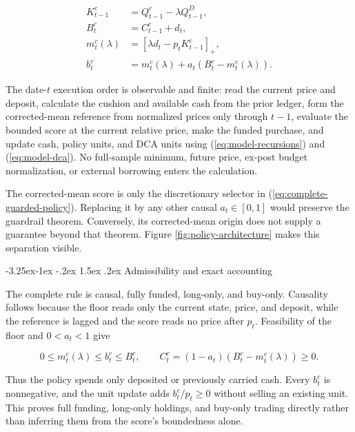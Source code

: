 \documentclass[12pt,a4paper,oneside]{report}
\makeatletter
\renewcommand\subsection{\@startsection{subsection}{2}{\z@}%
  {-3.25ex\@plus -1ex \@minus -.2ex}%
  {1.5ex \@plus .2ex}%
  {\normalfont\fontsize{12}{15}\selectfont\bfseries}}
\makeatother
\begin{document}
\begin{equation}
  \begin{split}
  K_{t-1}^c&=Q_{t-1}^c-\lambda Q_{t-1}^D,\\
  B_t^c&=C_{t-1}^c+d_t,\\
  m_t^c(\lambda)&=\left[\lambda d_t-p_tK_{t-1}^c\right]_+,\\
  b_t^c&=m_t^c(\lambda)
    +a_t\left(B_t^c-m_t^c(\lambda)\right).
  \end{split}
  \label{eq:complete-guarded-policy}
\end{equation}

The date-$t$ execution order is observable and finite: read the current price
and deposit, calculate the cushion and available cash from the prior ledger,
form the corrected-mean reference from normalized prices only through
$t-1$, evaluate the bounded score at the current relative price, make the
funded purchase, and update cash, policy units, and DCA units using
(\ref{eq:model-recursions}) and (\ref{eq:model-dca}). No full-sample minimum,
future price, ex-post budget normalization, or external borrowing enters the
calculation.

The corrected-mean score is only the discretionary selector in
(\ref{eq:complete-guarded-policy}). Replacing it by any other causal
$a_t\in[0,1]$ would preserve the guardrail theorem. Conversely, its
corrected-mean origin does not supply a guarantee beyond that theorem. Figure
\ref{fig:policy-architecture} makes this separation visible.

\subsection{Admissibility and exact accounting}
\label{sec:guarded-policy-properties}

The complete rule is causal, fully funded, long-only, and buy-only. Causality
follows because the floor reads only the current state, price, and deposit,
while the reference is lagged and the score reads no price after $p_t$.
Feasibility of the floor and $0<a_t<1$ give

\begin{equation}
  0\leq m_t^c(\lambda)\leq b_t^c\leq B_t^c,
  \qquad
  C_t^c=(1-a_t)\left(B_t^c-m_t^c(\lambda)\right)\geq0.
  \label{eq:guarded-policy-funding}
\end{equation}

Thus the policy spends only deposited or previously carried cash. Every
$b_t^c$ is nonnegative, and the unit update adds
$b_t^c/p_t\geq0$ without selling an existing unit. This proves full funding,
long-only holdings, and buy-only trading directly rather than inferring them
from the score's boundedness alone.
\end{document}
